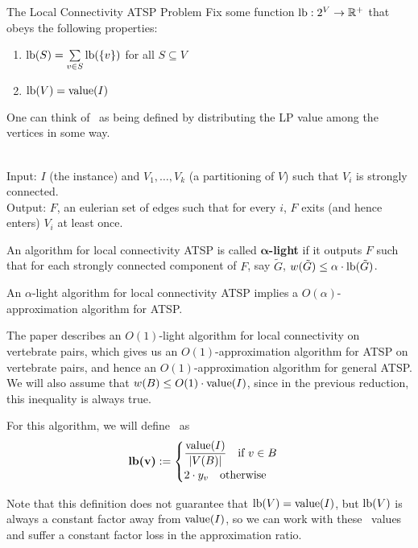 \documentclass[./main.tex]{subfiles}
\begin{document}
\begin{subsection}{The Local Connectivity ATSP Problem}
Fix some function $\textup{lb} : 2^V\rightarrow \mathbb{R}^+$ that obeys the following properties:
\begin{enumerate}
\item $\textup{lb}(S) = \sum\limits_{v\in S}\textup{lb}(\{v\})$ for all $S\subseteq V$
\item $\textup{lb}(V) = \textup{value}(I)$
\end{enumerate}
One can think of \lb\ as being defined by distributing the LP value among the vertices in some way.\vspace{3mm}
\begin{problem}
\ \\Input: $I$ (the instance) and $V_1,\ldots,V_k$ (a partitioning of $V$) such that $V_i$ is strongly connected.
\\Output: $F$, an eulerian set of edges such that for every $i$, $F$ exits (and hence enters) $V_i$ at least once.\end{problem}\vspace{4mm}
\begin{definition}
An algorithm for local connectivity ATSP is called $\bm{\alpha}$\textbf{-light} if it outputs $F$ such that for each strongly connected component of $F$, say $\tilde{G}$, $w(\tilde{G})\leq \alpha\cdot \textup{lb}(\tilde{G})$.
\end{definition}\vspace{2mm}
\begin{theorem}[Svensson '15] An $\alpha$-light algorithm for local connectivity ATSP implies a $O(\alpha)$-approximation algorithm for ATSP.
\end{theorem}
The paper describes an $O(1)$-light algorithm for local connectivity on vertebrate pairs, which gives us an $O(1)$-approximation algorithm for ATSP on vertebrate pairs, and hence an $O(1)$-approximation algorithm for general ATSP.\vspace{2mm}
\\We will also assume that $w(B)\leq O(1)\cdot \textup{value}(I)$, since in the previous reduction, this inequality is always true.
\begin{definition}
For this algorithm, we will define \lb\ as $$\textbf{\textup{lb}(v)}:=
\begin{cases}
\dfrac{\textup{value}(I)}{|V(B)|}\quad \text{if }v\in B\\
2\cdot y_v\quad \text{otherwise}
\end{cases}$$
\end{definition}
Note that this definition does not guarantee that $\textup{lb}(V) = \textup{value}(I)$, but $\textup{lb}(V)$ is always a constant factor away from $\textup{value}(I)$, so we can work with these \lb\ values and suffer a constant factor loss in the approximation ratio.\vspace{2mm}
\end{subsection}
\end{document}
